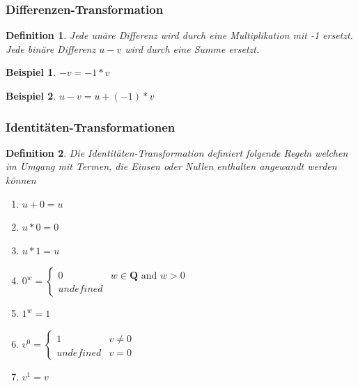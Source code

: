 \documentclass[11pt]{article}
\newtheorem{defin}{Definition}
\newtheorem{example}{Beispiel}
\begin{document}
\subsubsection{Differenzen-Transformation}
\begin{defin}
\label{def:differenzen_transformation}
Jede unäre Differenz wird durch eine Multiplikation mit -1 ersetzt. 
Jede binäre Differenz $u-v$ wird durch eine Summe ersetzt.
\end{defin}

\begin{example}
  $-v = -1 * v$
\end{example}
  
\begin{example}
  $u - v = u + (-1) * v $
\end{example}

\subsubsection{Identitäten-Transformationen}

\begin{defin}
  \label{def:identitaeten_transformation}
  Die Identitäten-Transformation definiert folgende Regeln welchen im Umgang mit Termen, die
  Einsen oder Nullen enthalten angewandt werden können
  \begin{enumerate}
    \item $u+0 = u$
    \item $u*0 = 0$
    \item $u*1 = u$
    \item $
            0^w = \left\{
                \begin{array}{ll}
                    0         & w \in \mathbf{Q} \textrm{ and } w > 0 \\
                    undefined & 
                \end{array}
            \right.$
    \item $1^w = 1$
    \item $
          v^0 = \left\{
              \begin{array}{ll}
                  1         & v \neq 0 \\
                  undefined & v = 0 
              \end{array}
          \right.
          $
    \item $v^1 = v$
  \end{enumerate}
\end{defin}
\end{document}
